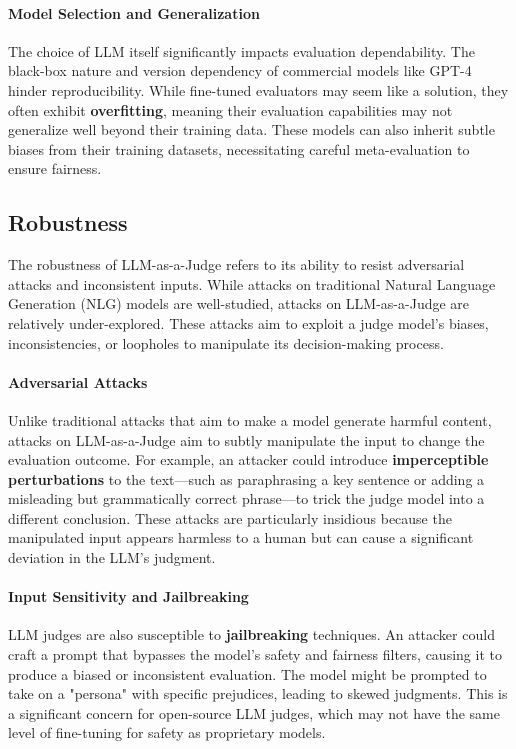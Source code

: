 \paragraph{\textbf{Model Selection and Generalization}}
The choice of LLM itself significantly impacts evaluation dependability. The black-box nature and version dependency of commercial models like GPT-4 hinder reproducibility. While fine-tuned evaluators may seem like a solution, they often exhibit \textbf{overfitting}, meaning their evaluation capabilities may not generalize well beyond their training data. These models can also inherit subtle biases from their training datasets, necessitating careful meta-evaluation to ensure fairness.

\subsection{Robustness}
The robustness of LLM-as-a-Judge refers to its ability to resist adversarial attacks and inconsistent inputs. While attacks on traditional Natural Language Generation (NLG) models are well-studied, attacks on LLM-as-a-Judge are relatively under-explored. These attacks aim to exploit a judge model's biases, inconsistencies, or loopholes to manipulate its decision-making process.

\paragraph{\textbf{Adversarial Attacks}}
Unlike traditional attacks that aim to make a model generate harmful content, attacks on LLM-as-a-Judge aim to subtly manipulate the input to change the evaluation outcome. For example, an attacker could introduce \textbf{imperceptible perturbations} to the text---such as paraphrasing a key sentence or adding a misleading but grammatically correct phrase---to trick the judge model into a different conclusion. These attacks are particularly insidious because the manipulated input appears harmless to a human but can cause a significant deviation in the LLM's judgment.

\paragraph{\textbf{Input Sensitivity and Jailbreaking}}
LLM judges are also susceptible to \textbf{jailbreaking} techniques. An attacker could craft a prompt that bypasses the model's safety and fairness filters, causing it to produce a biased or inconsistent evaluation. The model might be prompted to take on a "persona" with specific prejudices, leading to skewed judgments. This is a significant concern for open-source LLM judges, which may not have the same level of fine-tuning for safety as proprietary models.

